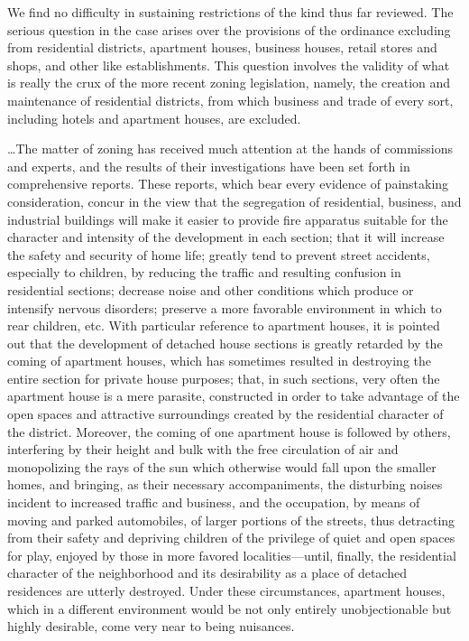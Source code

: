 We find no difficulty in sustaining restrictions of the kind thus far reviewed.
The serious question in the case arises over the provisions of the ordinance
excluding from residential districts, apartment houses, business houses, retail
stores and shops, and other like establishments. This question involves the
validity of what is really the crux of the more recent zoning legislation,
namely, the creation and maintenance of residential districts, from which
business and trade of every sort, including hotels and apartment houses, are
excluded. 

\ldots The matter of zoning has received much attention at the hands of
commissions and experts, and the results of their investigations have been set
forth in comprehensive reports. These reports, which bear every evidence of
painstaking consideration, concur in the view that the segregation of
residential, business, and industrial buildings will make it easier to provide
fire apparatus suitable for the character and intensity of the development in
each section; that it will increase the safety and security of home life;
greatly tend to prevent street accidents, especially to children, by reducing
the traffic and resulting confusion in residential sections; decrease noise and
other conditions which produce or intensify nervous disorders; preserve a more
favorable environment in which to rear children, etc. With particular reference
to apartment houses, it is pointed out that the development of detached house
sections is greatly retarded by the coming of apartment houses, which has
sometimes resulted in destroying the entire section for private house purposes;
that, in such sections, very often the apartment house is a mere parasite,
constructed in order to take advantage of the open spaces and attractive
surroundings created by the residential character of the district. Moreover, the
coming of one apartment house is followed by others, interfering by their height
and bulk with the free circulation of air and monopolizing the rays of the sun
which otherwise would fall upon the smaller homes, and bringing, as their
necessary accompaniments, the disturbing noises incident to increased traffic
and business, and the occupation, by means of moving and parked automobiles, of
larger portions of the streets, thus detracting from their safety and depriving
children of the privilege of quiet and open spaces for play, enjoyed by those in
more favored localities---until, finally, the residential character of the
neighborhood and its desirability as a place of detached residences are utterly
destroyed. Under these circumstances, apartment houses, which in a different
environment would be not only entirely unobjectionable but highly desirable,
come very near to being nuisances.

